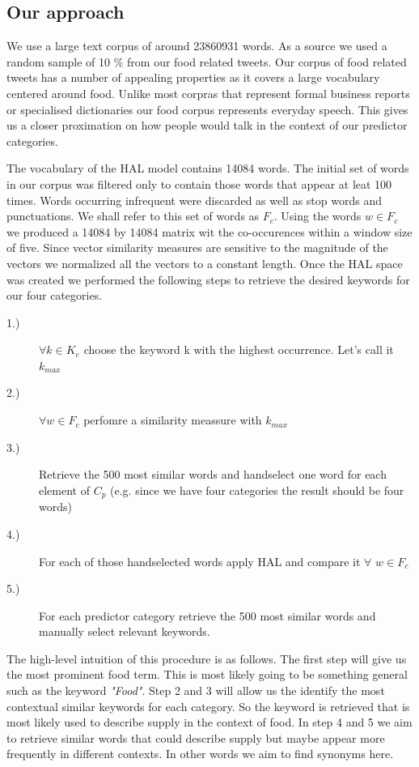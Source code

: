 \documentclass[12pt]{report}
\begin{document}
\subsection{Our approach}

We use a large text corpus of around 23860931 words. As a source we used a random sample of 10 \% from our food related tweets. Our corpus of food related tweets has a number of appealing properties as it covers a large vocabulary centered around food. Unlike most corpras that represent formal business reports or specialised dictionaries our food corpus represents everyday speech. This gives us a closer proximation on how people would talk in the context of our predictor categories. 

The vocabulary of the HAL model contains 14084 words. The initial set of words in our corpus was filtered only to contain those words that appear at leat 100 times. Words occurring infrequent were discarded as well as stop words and punctuations. We shall refer to this set of words as $F_c$. Using the words $w \in F_c$ we produced a 14084 by 14084 matrix wit the co-occurences within a window size of five. Since vector similarity measures are sensitive to the magnitude of the vectors we normalized all the vectors to a constant length. Once the HAL space was created we performed the following steps to retrieve the desired keywords for our four categories. 


\begin{description}
  \item[1.)] $\forall k \in K_e$ choose the keyword k with the highest occurrence. Let's call it $k_{max}$  
  \item[2.)] $\forall w \in F_c $ perfomre a similarity meassure with $k_{max}$
  \item[3.)] Retrieve the 500 most similar words and handselect one word for each element of $C_p$ (e.g. since we have four categories the result should be four words)
  \item[4.)] For each of those handselected words  apply HAL and compare it $\forall$ $w \in F_c $
  \item[5.)] For each predictor category retrieve the 500 most similar words and manually select relevant keywords. 
  \end{description}

The high-level intuition of this procedure is as follows. The first step will give us the most prominent food term. This is most likely going to be something general such as the keyword \emph{"Food"}. Step 2 and 3 will allow us the identify the most contextual similar keywords for each category. So the keyword is retrieved that is most likely used to describe supply in the context of food. In step 4 and 5 we aim to retrieve similar words that could describe supply but maybe appear more frequently in different contexts. In other words we aim to find synonyms here.   
\end{document}
